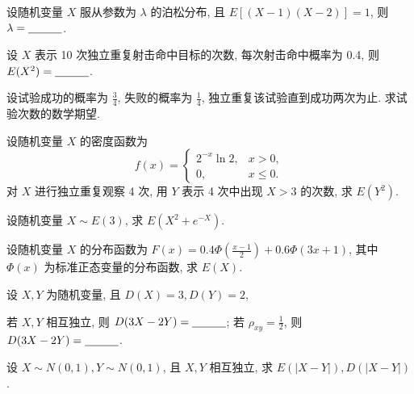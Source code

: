 \documentclass[padp]{ExBook}
\begin{document}
\begin{qitems}

    \begin{bbox}
        \qitem 设随机变量 $X$ 服从参数为 $\lambda$ 的泊松分布, 且 $E[(X-1)(X-2)]=1$, 则 $\lambda = \underline{\hspace{3em}}$.
    \end{bbox}

    \begin{bbox}
        \qitem 设 $X$ 表示 10 次独立重复射击命中目标的次数, 每次射击命中概率为 0.4, 则 $E(X^2) = \underline{\hspace{3em}}$.
    \end{bbox}

    \begin{bbox}
        \qitem 设试验成功的概率为 $\frac{3}{4}$, 失败的概率为 $\frac{1}{4}$, 独立重复该试验直到成功两次为止. 求试验次数的数学期望.
    \end{bbox}

    \begin{bbox}
        \qitem 设随机变量 $X$ 的密度函数为
        $$ f(x) = \begin{cases} 2^{-x}\ln 2, & x>0, \\ 0, & x \le 0. \end{cases} $$
        对 $X$ 进行独立重复观察 4 次, 用 $Y$ 表示 4 次中出现 $X>3$ 的次数, 求 $E(Y^2)$.
    \end{bbox}

    \begin{bbox}
        \qitem 设随机变量 $X \sim E(3)$, 求 $E(X^2+e^{-X})$.
    \end{bbox}

    \begin{bbox}
        \qitem 设随机变量 $X$ 的分布函数为 $F(x) = 0.4\Phi(\frac{x-1}{2}) + 0.6\Phi(3x+1)$, 其中 $\Phi(x)$ 为标准正态变量的分布函数, 求 $E(X)$.
    \end{bbox}

    \begin{bbox}
        \qitem 设 $X,Y$ 为随机变量, 且 $D(X)=3, D(Y)=2$,
        \begin{subqitems}
            \subqitem 若 $X,Y$ 相互独立, 则 $D(3X-2Y) = \underline{\hspace{3em}}$;
            \subqitem 若 $\rho_{xy} = \frac{1}{2}$, 则 $D(3X-2Y) = \underline{\hspace{3em}}$.
        \end{subqitems}
    \end{bbox}

    \begin{bbox}
        \qitem 设 $X \sim N(0,1), Y \sim N(0,1)$, 且 $X,Y$ 相互独立, 求 $E(|X-Y|), D(|X-Y|)$.
    \end{bbox}


\end{qitems}
\end{document}
